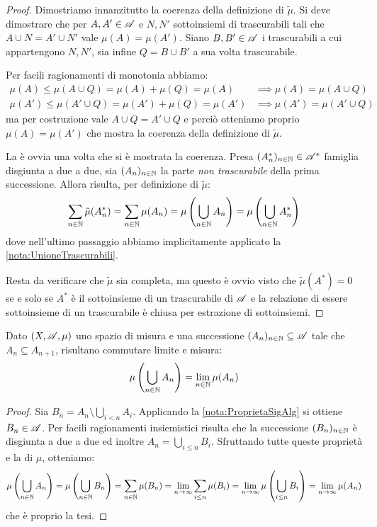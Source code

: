 \begin{proof}
	Dimostriamo innanzitutto la coerenza della definizione di $\tilde\mu$. Si deve dimostrare che per $A,A'\in\mathscr A$ e $N,N'$ sottoinsiemi di trascurabili tali che $A\cup N=A'\cup N'$ vale $\mu(A)=\mu(A')$. Siano $B,B'\in\mathscr A$ i trascurabili a cui appartengono $N,N'$, sia infine $Q=B\cup B'$ a sua volta trascurabile.
	
	Per facili ragionamenti di monotonia abbiamo:
	\begin{align*}
		\mu(A)\le \mu(A\cup Q) =\mu(A)+\mu(Q)=\mu(A) &\implies \mu(A)=\mu(A\cup Q)\\
		\mu(A')\le \mu(A'\cup Q) =\mu(A')+\mu(Q)=\mu(A') &\implies \mu(A')=\mu(A'\cup Q)
	\end{align*}
	ma per costruzione vale $A\cup Q=A'\cup Q$ e perciò otteniamo proprio $\mu(A)=\mu(A')$ che mostra la coerenza della definizione di $\tilde\mu$.
	
	La \sigadd[ità] è ovvia una volta che si è mostrata la coerenza. Presa $(A^*_n)_{n\in\mathbb N}\in\mathscr A^*$ famiglia disgiunta a due a due, sia $(A_n)_{n\in\mathbb N}$ la parte \emph{non trascurabile} della prima successione. Allora risulta, per definizione di $\tilde\mu$:
	\begin{equation*}
		\sum_{n\in\mathbb N} \tilde\mu(A^*_n)=\sum_{n\in\mathbb N} \mu(A_n)=\mu\left(\bigcup_{n\in\mathbb N} A_n\right)=\mu\left(\bigcup_{n\in\mathbb N} A^*_n\right)
	\end{equation*}
	dove nell'ultimo passaggio abbiamo implicitamente applicato la \cref{nota:UnioneTrascurabili}.
	
	Resta da verificare che $\tilde\mu$ sia completa, ma questo è ovvio visto che  $\tilde\mu(A^*)=0$ se e solo se $A^*$ è il sottoinsieme di un trascurabile di $\mathscr A$ e la relazione di essere sottoinsieme di un trascurabile è chiusa per estrazione di sottoinsiemi. 
\end{proof}



\begin{proposition}\label{prop:LimiteMonotonoCrescenteMisura}
	Dato $(X,\mathscr A,\mu)$ uno spazio di misura e una successione $(A_n)_{n\in\mathbb N}\subseteq \mathscr A$ tale che $A_n\subseteq A_{n+1}$, risultano commutare limite e misura:
	\begin{equation*}
		\mu\left(\bigcup_{n\in\mathbb N} A_n\right)=\lim_{n\in\mathbb N} \mu(A_n)
	\end{equation*}
\end{proposition}
\begin{proof}
	Sia $B_n=A_n\setminus\bigcup_{i<n}A_i$. Applicando la \cref{nota:ProprietaSigAlg} si ottiene $B_n\in\mathscr A$.
	Per facili ragionamenti insiemistici risulta che la successione $(B_n)_{n\in\mathbb N}$ è disgiunta a due a due ed inoltre $A_n=\bigcup_{i\le n}B_i$.
	Sfruttando tutte queste proprietà e la \sigadd[ità] di $\mu$, otteniamo:
	\begin{equation*}
		\mu\left(\bigcup_{n\in\mathbb N} A_n\right)=\mu\left(\bigcup_{n\in\mathbb N} B_n\right)=
		\sum_{n\in\mathbb N} \mu(B_n)=\lim_{n\to\infty} \sum_{i\le n} \mu(B_i)=
		\lim_{n\to\infty} \mu\left(\bigcup_{i\le n} B_i\right)=\lim_{n\to\infty} \mu(A_n)
	\end{equation*}
	che è proprio la tesi.
\end{proof}

